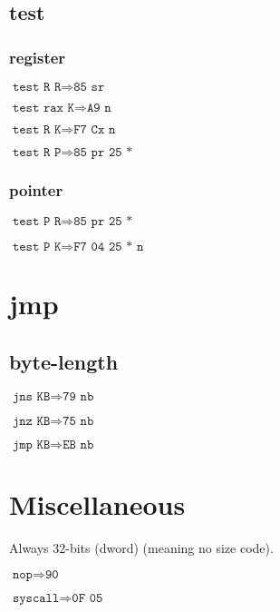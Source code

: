\documentclass{article}
\begin{document}
\subsection{test}
\begin{minipage}{\textwidth}

\subsubsection{register}

$\texttt{test R R} \Rightarrow \texttt{85 sr}$

$\texttt{test rax K} \Rightarrow \texttt{A9 n}$

$\texttt{test R K} \Rightarrow \texttt{F7 Cx n}$

$\texttt{test R P} \Rightarrow \texttt{85 pr 25 *}$

\subsubsection{pointer}

$\texttt{test P R} \Rightarrow \texttt{85 pr 25 *}$

$\texttt{test P K} \Rightarrow \texttt{F7 04 25 * n}$

\end{minipage}


\section{jmp}

\subsection{byte-length}
\begin{minipage}{\textwidth}

$\texttt{jns KB} \Rightarrow \texttt{79 nb}$

$\texttt{jnz KB} \Rightarrow \texttt{75 nb}$

$\texttt{jmp KB} \Rightarrow \texttt{EB nb}$

\end{minipage}


\section{Miscellaneous}
\begin{minipage}{\textwidth}

    Always 32-bits (dword) (meaning no size code).

$\texttt{nop} \Rightarrow \texttt{90}$

$\texttt{syscall} \Rightarrow \texttt{0F 05}$

\end{minipage}
\end{document}
